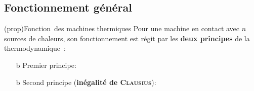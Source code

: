 \documentclass[../../main/main.tex]{subfiles}
\begin{document}
\subsection{Fonctionnement général}
\begin{tcb*}[sidebyside, label=prop:mchn](prop){Fonction\mnt\ des machines thermiques}
	Pour une machine en contact avec $n$ sources de chaleurs, son fonctionnement
	est régit par les \textbf{deux principes} de la thermodynamique~:
	\begin{itemize}
		\item[b]{Premier principe}:
		\vspace{-15pt}
		\item[b]{Second principe} (\textbf{inégalité de \textsc{Clausius}}):
		\vspace{-15pt}
	\end{itemize}
	\tcblower
	\begin{center}
\end{center}
\end{tcb*}
\end{document}
